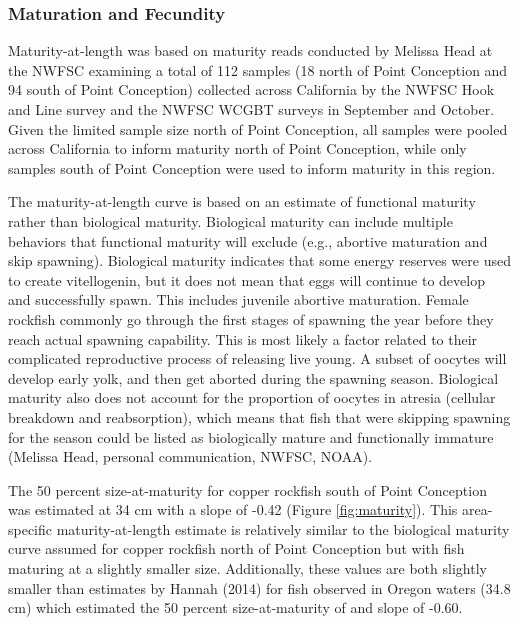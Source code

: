 \documentclass[11pt,
  english,
  letterpaper,
]{article}
\begin{document}
\hypertarget{maturation-and-fecundity}{%
\subsubsection{Maturation and Fecundity}\label{maturation-and-fecundity}}

Maturity-at-length was based on maturity reads conducted by Melissa Head at the NWFSC examining a total of 112 samples (18 north of Point Conception and 94 south of Point Conception) collected across California by the NWFSC Hook and Line survey and the NWFSC WCGBT surveys in September and October. Given the limited sample size north of Point Conception, all samples were pooled across California to inform maturity north of Point Conception, while only samples south of Point Conception were used to inform maturity in this region.

The maturity-at-length curve is based on an estimate of functional maturity rather than biological maturity. Biological maturity can include multiple behaviors that functional maturity will exclude (e.g., abortive maturation and skip spawning). Biological maturity indicates that some energy reserves were used to create vitellogenin, but it does not mean that eggs will continue to develop and successfully spawn. This includes juvenile abortive maturation. Female rockfish commonly go through the first stages of spawning the year before they reach actual spawning capability. This is most likely a factor related to their complicated reproductive process of releasing live young. A subset of oocytes will develop early yolk, and then get aborted during the spawning season. Biological maturity also does not account for the proportion of oocytes in atresia (cellular breakdown and reabsorption), which means that fish that were skipping spawning for the season could be listed as biologically mature and functionally immature (Melissa Head, personal communication, NWFSC, NOAA).

The 50 percent size-at-maturity for copper rockfish south of Point Conception was estimated at 34 cm with a slope of -0.42 (Figure \ref{fig:maturity}). This area-specific maturity-at-length estimate is relatively similar to the biological maturity curve assumed for copper rockfish north of Point Conception but with fish maturing at a slightly smaller size. Additionally, these values are both slightly smaller than estimates by Hannah (2014) for fish observed in Oregon waters (34.8 cm) which estimated the 50 percent size-at-maturity of and slope of -0.60.
\end{document}
